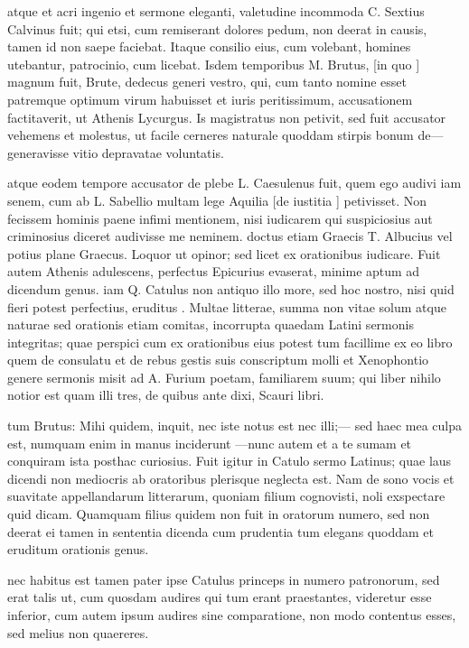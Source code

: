  atque et acri ingenio et sermone eleganti, valetudine incommoda C. Sextius Calvinus fuit; qui etsi, cum remiserant dolores pedum, non deerat in causis, tamen id non saepe faciebat. Itaque consilio eius, cum volebant, homines utebantur, patrocinio, cum licebat. Isdem temporibus M. Brutus, [in quo ] magnum fuit, Brute, dedecus generi vestro, qui, cum tanto nomine esset patremque optimum virum habuisset et iuris peritissimum, accusationem factitaverit, ut Athenis Lycurgus. Is magistratus non petivit, sed fuit accusator vehemens et molestus, ut facile cerneres naturale quoddam stirpis bonum de— generavisse vitio depravatae voluntatis.

 atque eodem tempore accusator de plebe L. Caesulenus fuit, quem ego audivi iam senem, cum ab L. Sabellio multam lege Aquilia [de iustitia ] petivisset. Non fecissem hominis paene infimi mentionem, nisi iudicarem qui suspiciosius aut criminosius diceret audivisse me neminem. doctus etiam Graecis T. Albucius vel potius plane Graecus. Loquor ut opinor; sed licet ex orationibus iudicare. Fuit autem Athenis adulescens, perfectus Epicurius evaserat, minime aptum ad dicendum genus. iam Q. Catulus non antiquo illo more, sed hoc nostro, nisi quid fieri potest perfectius, eruditus . Multae litterae, summa non vitae solum atque naturae sed orationis etiam comitas, incorrupta quaedam Latini sermonis integritas; quae perspici cum ex orationibus eius potest tum facillime ex eo libro quem de consulatu et de rebus gestis suis conscriptum molli et Xenophontio genere sermonis misit ad A. Furium poetam, familiarem suum; qui liber nihilo notior est quam illi tres, de quibus ante dixi, Scauri libri.

 tum Brutus: Mihi quidem, inquit, nec iste notus est nec illi;— sed haec mea culpa est, numquam enim in manus inciderunt —nunc autem et a te sumam et conquiram ista posthac curiosius. Fuit igitur in Catulo sermo Latinus; quae laus dicendi non mediocris ab oratoribus plerisque neglecta est. Nam de sono vocis et suavitate appellandarum litterarum, quoniam filium cognovisti, noli exspectare quid dicam. Quamquam filius quidem non fuit in oratorum numero, sed non deerat ei tamen in sententia dicenda cum prudentia tum elegans quoddam et eruditum orationis genus.

 nec habitus est tamen pater ipse Catulus princeps in numero patronorum, sed erat talis ut, cum quosdam audires qui tum erant praestantes, videretur esse inferior, cum autem ipsum audires sine comparatione, non modo contentus esses, sed melius non quaereres.

